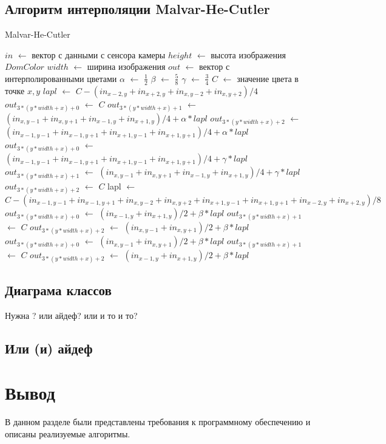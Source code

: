 \subsection{Алгоритм интерполяции Malvar-He-Cutler}
\begin{algorithm}[H]
	\caption{Malvar-He-Cutler}
	\label{alg:mhc}
	\begin{algorithmic}[1]
		\State $in$ $\gets$ вектор с данными с сенсора камеры
		\State $height$ $\gets$ высота изображения $DomColor$
		\State $width$ $\gets$ ширина изображения
		\State $out$ $\gets$ вектор с интерполированными цветами
		\State $\alpha$ $\gets$ $\frac{1}{2}$
		\State $\beta$ $\gets$ $\frac{5}{8}$
		\State $\gamma$ $\gets$ $\frac{3}{4}$
		\State $C$ $\gets$ значение цвета в точке $x,y$
		\State $lapl$ $\gets$ $C - (in_{x-2, y} + in_{x+2, y} + in_{x, y-2} + in_{x, y+2}) / 4$
		\State $out_{3 * (y * width + x) + 0}$ $\gets$ $C$
		\State $out_{3 * (y * width + x) + 1}$ $\gets$ $(in_{x, y-1} + in_{x, y + 1} + in_{x - 1, y} + in_{x + 1, y}) / 4 + \alpha * lapl$
		\State $out_{3 * (y * width + x) + 2}$ $\gets$ $(in_{x-1, y-1} + in_{x-1, y+1} + in_{x+1, y-1} + in_{x+1, y+1}) / 4 + \alpha * lapl$
		\EndIf
		\State $out_{3 * (y * width + x) + 0}$ $\gets$ $(in_{x-1, y-1} + in_{x-1, y+1} + in_{x+1, y-1} + in_{x+1, y+1}) / 4 + \gamma * lapl$
		\State $out_{3 * (y * width + x) + 1}$ $\gets$ $(in_{x, y-1} + in_{x, y + 1} + in_{x - 1, y} + in_{x + 1, y}) / 4 + \gamma * lapl$
		\State $out_{3 * (y * width + x) + 2}$ $\gets$ $C$
		\EndIf
		\State lapl $\gets$ $C - (in_{x-1, y-1} + in_{x-1, y+1} + in_{x, y-2} + in_{x, y+2}+ in_{x+1, y-1}+ in_{x+1, y+1}+ in_{x-2, y}+ in_{x+2, y}) / 8$
		\State $out_{3 * (y * width + x) + 0}$ $\gets$ $(in_{x-1, y} + in_{x+1, y}) / 2 + \beta * lapl$
		\State $out_{3 * (y * width + x) + 1}$ $\gets$ $C$
		\State $out_{3 * (y * width + x) + 2}$ $\gets$ $(in_{x, y - 1} + in_{x, y+1}) / 2 + \beta * lapl$
		\EndIf
		\State $out_{3 * (y * width + x) + 0}$ $\gets$ $(in_{x, y - 1} + in_{x, y+1}) / 2 + \beta * lapl$
		\State $out_{3 * (y * width + x) + 1}$ $\gets$ $C$
		\State $out_{3 * (y * width + x) + 2}$ $\gets$ $(in_{x-1, y} + in_{x+1, y}) / 2 + \beta * lapl$
		\EndIf
		\EndFor
		\EndFor
	\end{algorithmic}
\end{algorithm}

\subsection{Диаграма классов}

Нужна ? или айдеф? или и то и то?

\subsection{Или (и) айдеф}

\section*{Вывод}

В данном разделе были представлены требования к программному обеспечению и описаны реализуемые алгоритмы.

